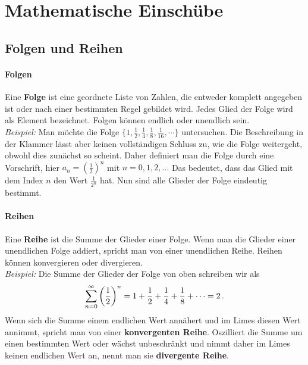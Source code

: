 \chapter{Mathematische Einschübe}\label{chap: MathematischeEinschübe}
\section{Folgen und Reihen}\label{sec: Folgen_Reihen}
\subsubsection{Folgen}\label{subsec: Folgen}
Eine \textbf{Folge} ist eine geordnete Liste von Zahlen, die entweder komplett angegeben ist oder nach einer bestimmten Regel gebildet wird. Jedes Glied der Folge wird als Element bezeichnet. Folgen können endlich oder unendlich sein. \\ 

\noindent\textit{Beispiel:} Man möchte die Folge $\{1, \frac{1}{2},\frac{1}{4}, \frac{1}{8}, \frac{1}{16}, \cdots \}$ untersuchen. Die Beschreibung in der Klammer lässt aber keinen vollständigen Schluss zu, wie die Folge weitergeht, obwohl dies zunächst so scheint. Daher definiert man die Folge durch eine Vorschrift, hier $a_n = \left(\frac{1}{2}\right)^n$ mit $n = 0, 1, 2, \dots$ Das bedeutet, dass das Glied mit dem Index $n$ den Wert $\frac{1}{2^n}$ hat. Nun sind alle Glieder der Folge eindeutig bestimmt. 


\subsubsection{Reihen}\label{subsec: Reihen}
Eine \textbf{Reihe} ist die Summe der Glieder einer Folge. Wenn man die Glieder einer unendlichen Folge addiert, spricht man von einer unendlichen Reihe. Reihen können konvergieren oder divergieren. \\

\noindent \textit{Beispiel:} Die Summe der Glieder der Folge von oben schreiben wir als
\begin{equation*}
    \sum_{n=0}^{\infty} \left(\frac{1}{2}\right)^n = 1 + \frac{1}{2} + \frac{1}{4} + \frac{1}{8} + \cdots = 2 \,.
\end{equation*}
Wenn sich die Summe einem endlichen Wert annähert und im Limes diesen Wert annimmt, spricht man von einer \textbf{konvergenten Reihe}. Oszilliert die Summe um einen bestimmten Wert oder wächst unbeschränkt und nimmt daher im Limes keinen endlichen Wert an, nennt man sie \textbf{divergente Reihe}.
\newpage


